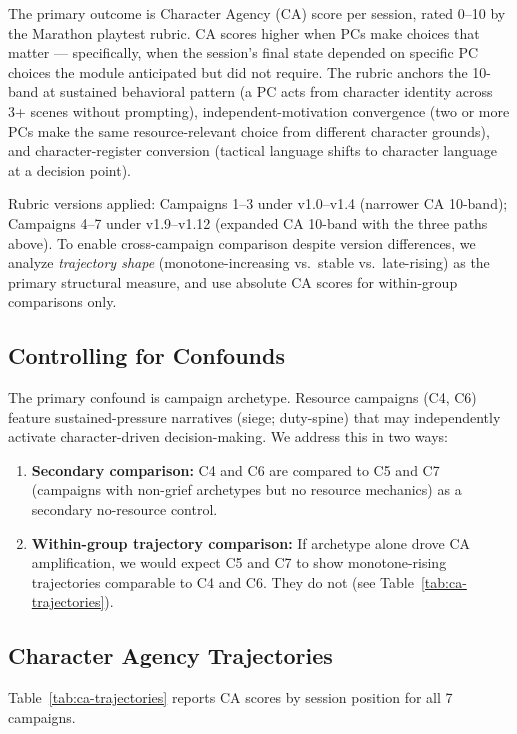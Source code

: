 The primary outcome is Character Agency (CA) score per session, rated 0--10 by the
Marathon playtest rubric. CA scores higher when PCs make choices that matter ---
specifically, when the session's final state depended on specific PC choices the
module anticipated but did not require. The rubric anchors the 10-band at sustained
behavioral pattern (a PC acts from character identity across 3+ scenes without
prompting), independent-motivation convergence (two or more PCs make the same
resource-relevant choice from different character grounds), and character-register
conversion (tactical language shifts to character language at a decision point).

Rubric versions applied: Campaigns 1--3 under v1.0--v1.4 (narrower CA 10-band);
Campaigns 4--7 under v1.9--v1.12 (expanded CA 10-band with the three paths above).
To enable cross-campaign comparison despite version differences, we analyze
\textit{trajectory shape} (monotone-increasing vs.\ stable vs.\ late-rising) as
the primary structural measure, and use absolute CA scores for within-group
comparisons only.

\subsection{Controlling for Confounds}

The primary confound is campaign archetype. Resource campaigns (C4, C6) feature
sustained-pressure narratives (siege; duty-spine) that may independently activate
character-driven decision-making. We address this in two ways:

\begin{enumerate}
  \item \textbf{Secondary comparison:} C4 and C6 are compared to C5 and C7 (campaigns
    with non-grief archetypes but no resource mechanics) as a secondary no-resource
    control.
  \item \textbf{Within-group trajectory comparison:} If archetype alone drove CA
    amplification, we would expect C5 and C7 to show monotone-rising trajectories
    comparable to C4 and C6. They do not (see Table~\ref{tab:ca-trajectories}).
\end{enumerate}

\subsection{Character Agency Trajectories}

Table~\ref{tab:ca-trajectories} reports CA scores by session position for all 7 campaigns.


